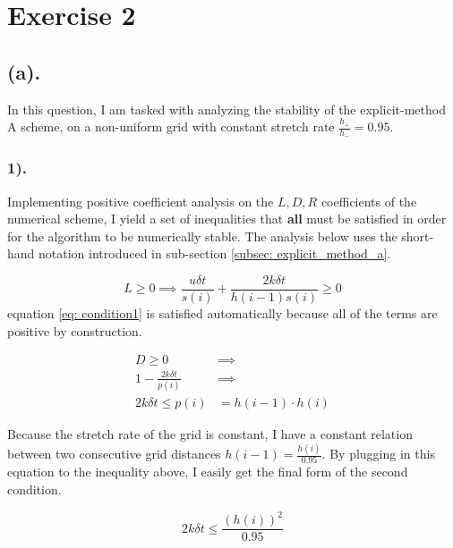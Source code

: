 
\section{Exercise 2}
\label{sec: exercise2}

\subsection{(a).}
In this question, I am tasked with analyzing the stability of the explicit-method A scheme, on a non-uniform grid with constant stretch rate \( \frac{h_{+}}{h_{-}} = 0.95 \).

\subsubsection{1).}
Implementing positive coefficient analysis on the \( L, D, R \) coefficients of the numerical scheme, I yield a set of inequalities that \textbf{all} must be satisfied in order for the algorithm to be numerically stable. The analysis below uses the short-hand notation introduced in sub-section \ref{subsec: explicit_method_a}. 

\begin{equation} \label{eq: condition1}
	L \geq 0 \implies \frac{u \delta t}{s(i)} + \frac{2k \delta t}{h(i-1) s(i)} \geq 0
\end{equation}
equation \ref{eq: condition1} is satisfied automatically because all of the terms are positive by construction.

\begin{align*}
	D \geq 0 &\implies \\
	1 - \frac{2k \delta t}{p(i)} &\implies \\
	2k \delta t \leq p(i) &= h(i-1) \cdot h(i)
\end{align*}

Because the stretch rate of the grid is constant, I have a constant relation between two consecutive grid distances \( h(i-1) = \frac{h(i)}{0.95} \). By plugging in this equation to the inequality above, I easily get the final form of the second condition.

\begin{equation} \label{eq: condition2}
	2k \delta t \leq \frac{\left( h(i) \right)^2}{0.95} 
\end{equation}

